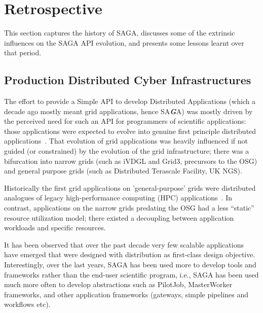 \documentclass{article}
\newcommand{\BI}[1]{\textbf{\textit{#1}}}
\begin{document}
\section{Retrospective}
\label{sec:retro}

 This section captures the history of SAGA, discusses some of the
 extrinsic influences on the SAGA API evolution, and presents some
 lessons learnt over that period.  


 \subsection{Production Distributed Cyber Infrastructures}

  The effort to provide a Simple API to develop Distributed Applications
  (which a decade ago mostly meant grid applications, hence SA\BI{G}A)
  was mostly driven by the perceived need for such an API for
  programmers of scientific applications: those applications were
  expected to evolve into genuine first principle distributed
  applications~\cite{gat}.  That evolution of grid applications was
  heavily influenced if not guided (or constrained) by the evolution of
  the grid infrastructure; there was a bifurcation into narrow grids
  (such as iVDGL and Grid3, precursors to the OSG) and general purpose
  grids (such as Distributed Terascale Facility, UK NGS).

  Historically the first grid applications on 'general-purpose' grids
  were distributed analogues of legacy high-performance computing (HPC)
  applications~\cite{dpagrid2009}. In contrast, applications on the
  narrow grids predating the OSG had a less ``static'' resource
  utilization model; there existed a decoupling between application
  workloads and specific resources\cite{boinc}.

  It has been observed that over the past decade very few
  scalable applications have emerged that were designed with 
  distribution as first-class design objective. Interestingly,
  over the last years, SAGA has been used more to develop
  tools and frameworks rather than the end-user scientific program,
  i.e., SAGA has been used much more often to develop abstractions such
  as PilotJob, MasterWorker frameworks, and other application frameworks
  (gateways, simple pipelines and workflows etc).
\end{document}

